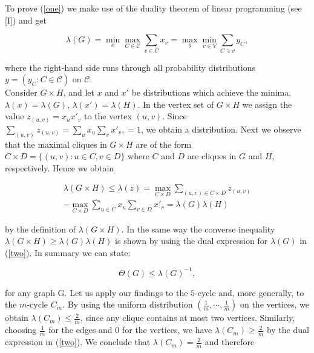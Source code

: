 \documentclass[12pt]{memoir}
\newcommand{\setsecondpagemargins}{
    \clearpage
    \setulmarginsandblock{2cm}{0.5cm}{*}
    \checkandfixthelayout
}
\begin{document}
To prove (\ref{one}) we make use of the duality theorem of linear programming 
(see [I]) and get

\begin{equation}
  \lambda(G) = \min_x\max_{C \in \mathcal{C}} \sum_{v\in C} x_v = \max_y\min_{v \in V}\sum_{C \ni v}y_C, \label{two}
\end{equation}

where the right-hand side runs through all probability distributions $y = (y_C : C \in \mathcal{C})$
on $\mathcal{C}$.\\
Consider $G \times H$, and let $x$ and $x'$ be distributions which achieve the 
minima, $\lambda(x) = \lambda(G)$, $\lambda(x') = \lambda(H)$. In the vertex set of $G \times H$ we 
assign the value $z_{(u,v)} = x_ux'_v$ to the vertex $(u, v)$. Since $\sum_{(u,v)}z_{(u,v)} = \sum_u x_u \sum_v x'_v, = 1$, 
we obtain a distribution. Next we observe that the maximal cliques in 
$G \times H$ are of the form $C \times D = \{(u, v) : u \in C, v \in D \} $
where $C$ and $D$ are cliques in $G$ and $H$, respectively. Hence we obtain 

\begin{equation*}
  \begin{align}
  \lambda(G \times H) \leq \lambda(z) = \max_{C \times D} \sum_{(u,v) \in C \times D} z_(u,v)\\
  - \max_{C \times D} \sum_{u\in C} x_u \sum_{v \in D} x'_v = \lambda(G)\lambda(H)
  \end{align}
\end{equation*}

\setsecondpagemargins

by the definition of $\lambda(G \times H)$. In the same way the converse inequality 
$\lambda(G \times H) \geq \lambda(G)\lambda(H)$ is shown by using the dual expression for $\lambda(G)$ 
in (\ref{two}). In summary we can state: 

\begin{equation*}
  \Theta(G) \leq \lambda(G)^{-1},
\end{equation*}

for any graph G.
Let us apply our findings to the $5$-cycle and, more generally, to the $m$-cycle $C_m$.
By using the uniform distribution $(\frac{1}{m},\dotsb,\frac{1}{m})$ on the 
vertices, we obtain $\lambda(C_m) \leq \frac{2}{m} $, since any clique contains at most two 
vertices. Similarly, choosing $\frac{1}{m}$ for the edges and $0$ for the vertices, we have 
$\lambda(C_m) \geq \frac{2}{m}$ by the dual expression in (\ref{two}). We conclude that $\lambda(C_m) = \frac{2}{m}$ 
and therefore 
\end{document}
